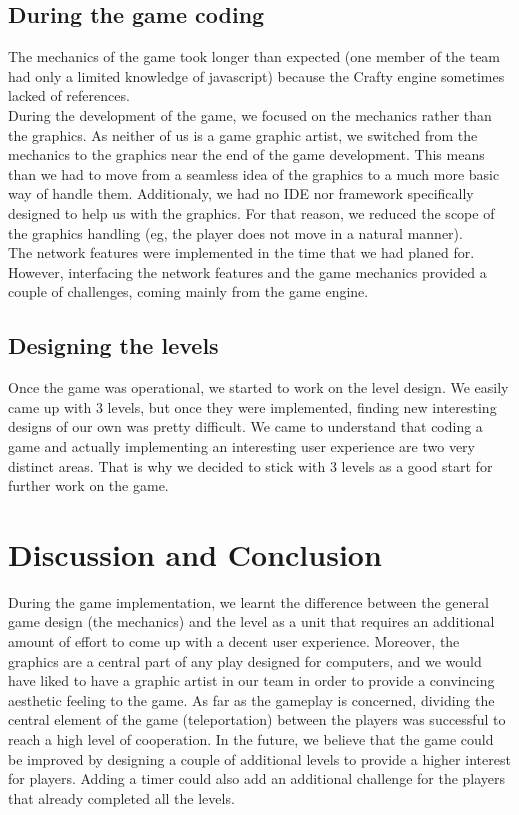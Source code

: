 \documentclass{chi-ext}
\begin{document}
\subsection{During the game coding}
The mechanics of the game took longer than expected (one member of the team had only a limited knowledge of javascript) because the Crafty engine sometimes lacked of references.\\
During the development of the game, we focused on the mechanics rather than the graphics. As neither of us is a game graphic artist, we switched from the mechanics to the graphics near the end of the game development. This means than we had to move from a seamless idea of the graphics to a much more basic way of handle them. Additionaly, we had no IDE nor framework specifically designed to help us with the graphics. For that reason, we reduced the scope of the graphics handling (eg, the player does not move in a natural manner).\\
The network features were implemented in the time that we had planed for. However, interfacing the network features and the game mechanics provided a couple of challenges, coming mainly from the game engine.

\subsection{Designing the levels}
Once the game was operational, we started to work on the level design. We easily came up with 3 levels, but once they were implemented, finding new interesting designs of our own was pretty difficult. We came to understand that coding a game and actually implementing an interesting user experience are two very distinct areas. That is why we decided to stick with 3 levels as a good start for further work on the game.

\section{Discussion and Conclusion}
During the game implementation, we learnt the difference between the general game design (the mechanics) and the level as a unit that requires an additional amount of effort to come up with a decent user experience.
\newline
Moreover, the graphics are a central part of any play designed for computers, and we would have liked to have a graphic artist in our team in order to provide a convincing aesthetic feeling to the game.
\newline
As far as the gameplay is concerned, dividing the central element of the game (teleportation) between the players was successful to reach a high level of cooperation.
\newline
In the future, we believe that the game could be improved by designing a couple of additional levels to provide a higher interest for players. Adding a timer could also add an additional challenge for the players that already completed all the levels.

\balance


\end{document}
